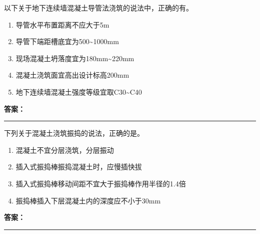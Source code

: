 \documentclass[UTF8,fontset=fandol,11pt]{ctexart}
\newcommand{\answerline}{\textcolor{answerred}{\rule{2.4cm}{0.7pt}}}
\begin{document}
\begin{quizbox}[title={乱序第 166 题｜第三章基坑工程}]

以下关于地下连续墙混凝土导管法浇筑的说法中，正确的有。\\

\begin{enumerate}[label=\Alph*.]

\item 导管水平布置距离不应大于5m

\item 导管下端距槽底宜为500\textasciitilde{}1000mm

\item 现场混凝土坍落度宜为180mm\textasciitilde{}220mm

\item 混凝土浇筑面宜高出设计标高200mm

\item 地下连续墙混凝土强度等级宜取C30\textasciitilde{}C40

\end{enumerate}

\textbf{\textcolor{answerred}{答案：}} \answerline

\end{quizbox}

\vspace{0.2em}

\begin{quizbox}[title={乱序第 167 题｜第四章混凝土结构工程}]

下列关于混凝土浇筑振捣的说法，正确的是。\\

\begin{enumerate}[label=\Alph*.]

\item 混凝土不宜分层浇筑，分层振动

\item 插入式振捣棒振捣混凝土时，应慢插快拔

\item 插入式振捣棒移动间距不宜大于振捣棒作用半径的1.4倍

\item 振捣棒插入下层混凝土内的深度应不小于30mm

\end{enumerate}

\textbf{\textcolor{answerred}{答案：}} \answerline

\end{quizbox}

\vspace{0.2em}
\end{document}
